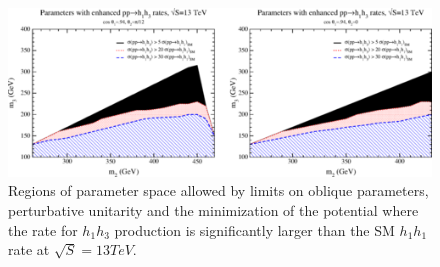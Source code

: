 \begin{figure}[h]
\begin{center}
\includegraphics[scale=0.65]{figures/CompHiggsSing_Fig6}
\caption{Regions of parameter space allowed by limits on oblique parameters, perturbative unitarity and the minimization of the potential where the rate for ${h_{1}h_{3}}$ production is significantly larger than the SM ${h_{1}h_{1}}$ rate at ${\sqrt{S} = 13 TeV}$.}
\label{fig:CSH6}
\end{center}
\end{figure}


